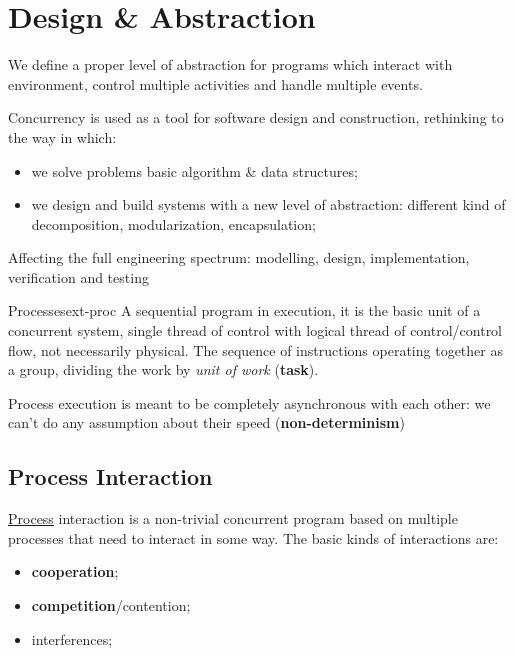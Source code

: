 \section{Design \& Abstraction}\label{sec:cp_design_abstraction} %
We define a proper level of abstraction for programs which interact with environment, control multiple activities and handle multiple events.
\begin{warning}
\end{warning}
Concurrency is used as a tool for software design and construction, rethinking to the way in which:
\begin{itemize}
    \item we solve problems basic algorithm \& data structures;
    \item we design and build systems with a new level of abstraction: different kind of decomposition, modularization, encapsulation;
\end{itemize}
\begin{note}
    Affecting the full engineering spectrum: modelling, design, implementation, verification and testing
\end{note}
\begin{remark}{Processes}{ext-proc}
    A sequential program in execution, it is the basic unit of a concurrent system, single thread of control with logical thread of control/control flow, not necessarily physical.
    The sequence of instructions operating together as a group, dividing the work by \textit{unit of work} (\textbf{task}).
    \begin{warning}
        Process execution is meant to be completely asynchronous with each other: we can't do any assumption about their speed (\textbf{non-determinism})
    \end{warning}
\end{remark}
%
\subsection{Process Interaction}\label{sub:cp_process_interaction} %
\hyperref[def:process]{Process} interaction is a non-trivial concurrent program based on multiple processes that need to interact in some way.
The basic kinds of interactions are:
\begin{itemize}
    \item \textbf{cooperation};
    \item \textbf{competition}/contention;
    \item interferences;
\end{itemize}
%
